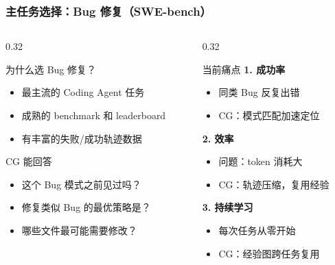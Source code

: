 \documentclass[aspectratio=169,10pt]{beamer}
\begin{document}
\begin{frame}
  \frametitle{主任务选择：Bug 修复（SWE-bench）}

  \begin{columns}[T]
    \begin{column}{0.32\textwidth}
      \begin{block}{为什么选 Bug 修复？}
        \begin{itemize}
          \item 最主流的 Coding Agent 任务
          \item 成熟的 benchmark 和 leaderboard
          \item 有丰富的失败/成功轨迹数据
        \end{itemize}
      \end{block}

      \begin{alertblock}{CG 能回答}
        \begin{itemize}
          \item 这个 Bug 模式之前见过吗？
          \item 修复类似 Bug 的最优策略是？
          \item 哪些文件最可能需要修改？
        \end{itemize}
      \end{alertblock}
    \end{column}

    \begin{column}{0.32\textwidth}
      \begin{block}{当前痛点}
        \textbf{1. 成功率}
        \begin{itemize}
          \item 同类 Bug 反复出错
          \item CG：模式匹配加速定位
        \end{itemize}

        \textbf{2. 效率}
        \begin{itemize}
          \item 问题：token 消耗大
          \item CG：轨迹压缩，复用经验
        \end{itemize}

        \textbf{3. 持续学习}
        \begin{itemize}
          \item 每次任务从零开始
          \item CG：经验图跨任务复用
        \end{itemize}
      \end{block}
    \end{column}


\end{columns}
\end{frame}
\end{document}
